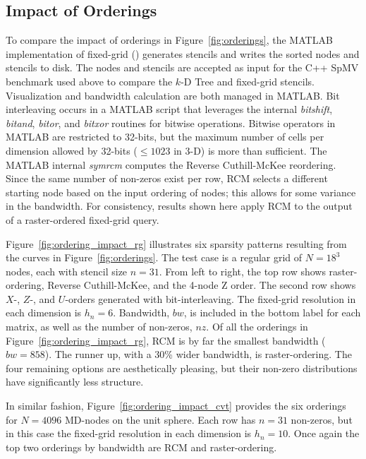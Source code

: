 \documentclass{report}
\begin{document}

\subsection{Impact of Orderings}

To compare the impact of orderings in Figure~\ref{fig:orderings}, the MATLAB implementation of fixed-grid (\cite{BolligRBFFixedGrid}) generates stencils and writes the sorted nodes and stencils to disk. The nodes and stencils are accepted as input for the C++ SpMV benchmark used above to compare 
the $k$-D Tree and fixed-grid stencils. Visualization and bandwidth calculation are both managed in MATLAB. 
Bit interleaving occurs in a MATLAB script that leverages the internal \emph{bitshift}, \emph{bitand}, \emph{bitor}, and \emph{bitxor} routines for bitwise operations. Bitwise operators in MATLAB are restricted to 32-bits, but the maximum number of cells per dimension allowed by 32-bits ($\leq 1023$ in $3$-D) is more than sufficient. The MATLAB internal \emph{symrcm} computes the Reverse Cuthill-McKee reordering. %
Since the same number of non-zeros exist per row, RCM selects a different starting node based on the input ordering of nodes; this allows for some variance in the bandwidth. For consistency, results shown here apply RCM to the output of a raster-ordered fixed-grid query. 

Figure~\ref{fig:ordering_impact_rg} illustrates six sparsity patterns resulting from the curves in Figure~\ref{fig:orderings}. The test case is a regular grid of $N=18^3$ nodes, each with stencil size $n=31$. From left to right, the top row shows raster-ordering, Reverse Cuthill-McKee, and the 4-node Z order. The second row shows $X$-, $Z$-, and $U$-orders generated with bit-interleaving. The fixed-grid resolution in each dimension is $h_n = 6$. Bandwidth, $bw$, is included in the bottom label for each matrix, as well as the number of non-zeros, $nz$. Of all the orderings in Figure~\ref{fig:ordering_impact_rg}, RCM is by far the smallest bandwidth ($bw=858$). The runner up, with a 30\% wider bandwidth, is raster-ordering.  The four remaining options are aesthetically pleasing, but their non-zero distributions have significantly less structure. 

In similar fashion, Figure~\ref{fig:ordering_impact_cvt} provides the six orderings for $N=4096$ MD-nodes on the unit sphere. Each row has $n=31$ non-zeros, but in this case the fixed-grid resolution in each dimension is $h_n = 10$. Once again the top two orderings by bandwidth are RCM and raster-ordering. 
\end{document}
